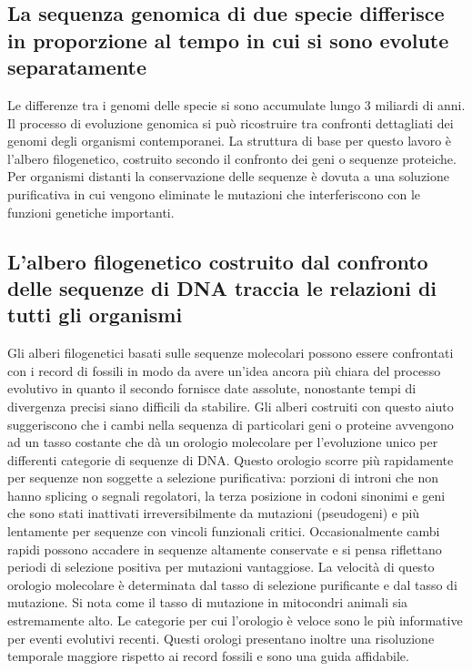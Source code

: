 \subsection{La sequenza genomica di due specie differisce in proporzione al tempo in cui si sono evolute separatamente}
Le differenze tra i genomi delle specie si sono accumulate lungo $3$ miliardi di anni. Il processo di evoluzione genomica si pu\`o ricostruire tra confronti dettagliati dei genomi degli
organismi contemporanei. La struttura di base per questo lavoro \`e l'albero filogenetico, costruito secondo il confronto dei geni o sequenze proteiche. Per organismi distanti la 
conservazione delle sequenze \`e dovuta a una soluzione purificativa in cui vengono eliminate le mutazioni che interferiscono con le funzioni genetiche importanti. 
\subsection{L'albero filogenetico costruito dal confronto delle sequenze di DNA traccia le relazioni di tutti gli organismi}
Gli alberi filogenetici basati sulle sequenze molecolari possono essere confrontati con i record di fossili in modo da avere un'idea ancora pi\`u chiara del processo evolutivo in quanto
il secondo fornisce date assolute, nonostante tempi di divergenza precisi siano difficili da stabilire. Gli alberi costruiti con questo aiuto suggeriscono che i cambi nella sequenza
di particolari geni o proteine avvengono ad un tasso costante che d\`a un orologio molecolare per l'evoluzione unico per differenti categorie di sequenze di DNA. Questo orologio scorre 
pi\`u rapidamente per sequenze non soggette a selezione purificativa: porzioni di introni che non hanno splicing o segnali regolatori, la terza posizione in codoni sinonimi e geni
che sono stati inattivati irreversibilmente da mutazioni (pseudogeni) e pi\`u lentamente per sequenze con vincoli funzionali critici. Occasionalmente cambi rapidi possono accadere in
sequenze altamente conservate e si pensa riflettano periodi di selezione positiva per mutazioni vantaggiose. La velocit\`a di questo orologio molecolare \`e determinata dal tasso di 
selezione purificante e dal tasso di mutazione. Si nota come il tasso di mutazione in mitocondri animali sia estremamente alto. Le categorie per cui l'orologio \`e veloce sono le pi\`u 
informative per eventi evolutivi recenti. Questi orologi presentano inoltre una risoluzione temporale maggiore rispetto ai record fossili e sono una guida affidabile. 
